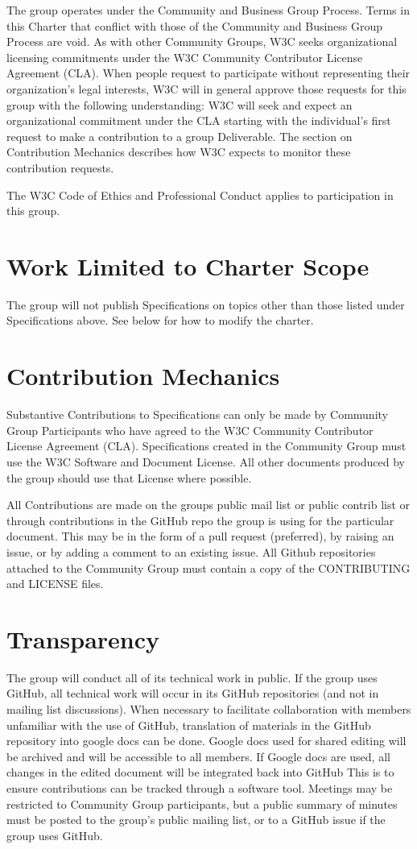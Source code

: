 \documentclass[title=small,preset=opensansnote,par=skip]{article}
\begin{document}
The group operates under the Community and Business Group Process. Terms in this Charter that conflict with those of the Community and Business Group Process are void. As with other Community Groups, W3C seeks organizational licensing commitments under the W3C Community Contributor License Agreement (CLA). When people request to participate without representing their organization's legal interests, W3C will in general approve those requests for this group with the following understanding: W3C will seek and expect an organizational commitment under the CLA starting with the individual's first request to make a contribution to a group Deliverable. The section on Contribution Mechanics describes how W3C expects to monitor these contribution requests.

The W3C Code of Ethics and Professional Conduct applies to participation in this group.
\section{Work Limited to Charter Scope}
\label{sec:org00d4e0a}

The group will not publish Specifications on topics other than those listed under Specifications above. See below for how to modify the charter.
\section{Contribution Mechanics}
\label{sec:org820306d}

Substantive Contributions to Specifications can only be made by Community Group Participants who have agreed to the W3C Community Contributor License Agreement (CLA). Specifications created in the Community Group must use the W3C Software and Document License. All other documents produced by the group should use that License where possible.

All Contributions are made on the groups public mail list or public contrib list or through contributions in the GitHub repo the group is using for the particular document. This may be in the form of a pull request (preferred), by raising an issue, or by adding a comment to an existing issue. All Github repositories attached to the Community Group must contain a copy of the CONTRIBUTING and LICENSE files.
\section{Transparency}
\label{sec:org9536718}

The group will conduct all of its technical work in public. If the group uses GitHub, all technical work will occur in its GitHub repositories (and not in mailing list discussions). When necessary to facilitate collaboration with members unfamiliar with the use of GitHub, translation of materials in the GitHub repository into google docs can be done. Google docs used for shared editing will be archived and will be accessible to all members. If Google docs are used, all changes in the edited document will be integrated back into GitHub This is to ensure contributions can be tracked through a software tool. Meetings may be restricted to Community Group participants, but a public summary of minutes must be posted to the group's public mailing list, or to a GitHub issue if the group uses GitHub.
\end{document}
